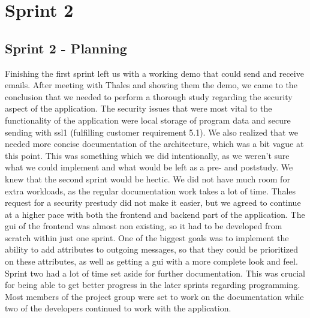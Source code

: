 \chapter{Sprint 2}

\section{Sprint 2 - Planning}
Finishing the first sprint left us with a working demo that could send and receive emails. After meeting with Thales and showing them the demo, we came to the conclusion that we needed to perform a thorough study regarding the security aspect of the application. The security issues that were most vital to the functionality of the application were local storage of program data and secure sending with \gls{ssl1} (fulfilling customer requirement 5.1). We also realized that we needed more concise documentation of the architecture, which was a bit vague at this point. This was something which we did intentionally, as we weren’t sure what we could implement and what would be left as a pre- and poststudy. 
\newline
\newline
We knew that the second sprint would be hectic. We did not have much room for extra workloads, as the regular documentation work takes a lot of time. Thales request for a security prestudy did not make it easier, but we agreed to continue at a higher pace with both the frontend and backend part of the application. The \gls{gui} of the frontend was almost non existing, so it had to be developed from scratch within just one sprint. One of the biggest goals was to implement the ability to add attributes to outgoing messages, so that they could be prioritized on these attributes, as well as getting a \gls{gui} with a more complete look and feel.
\newline
\newline
Sprint two had a lot of time set aside for further documentation. This was crucial for being able to get better progress in the later sprints regarding programming. Most members of the project group were set to work on the documentation while two of the developers continued to work with the application. 